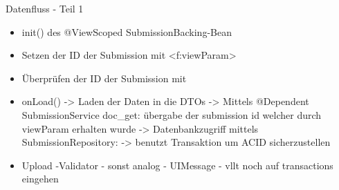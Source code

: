 \documentclass{beamer}
\begin{document}
    \begin{frame}{Datenfluss - Teil 1}
        \begin{itemize}
            \item init() des @ViewScoped SubmissionBacking-Bean
            \item Setzen der ID der Submission mit <f:viewParam>
            \item Überprüfen der ID der Submission mit %
            \item onLoad()
            -> Laden der Daten in die DTOs
            -> Mittels @Dependent SubmissionService doc_get: übergabe der submission id
            welcher durch viewParam erhalten wurde
            -> Datenbankzugriff mittels SubmissionRepository:
            -> benutzt Transaktion um ACID sicherzustellen
            \item Upload
            -Validator
            - sonst analog
            - UIMessage
            - vllt noch auf transactions eingehen
        \end{itemize}
    \end{frame}
\end{document}
